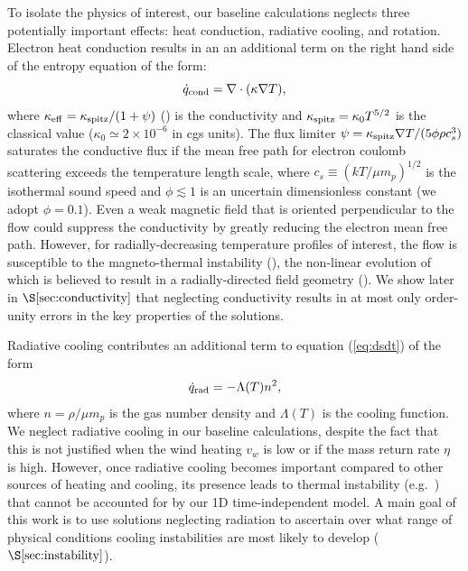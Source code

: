 \documentclass[usenatbib,fleqn]{mn2e}
\newcommand{\vwO}{v_{w}}
\begin{document}
To isolate the physics of interest, our baseline calculations neglects three potentially important effects: heat conduction, radiative cooling, and rotation.  Electron heat conduction results in an an additional term on the right hand side of the entropy equation of the form:  
\begin{equation}
\dot{q}_{\rm cond} = \nabla\cdot(\kappa \nabla T),
\label{eq:qdotcond}
 \end{equation}
where $\kappa_{\rm
  eff}=\kappa_{\rm spitz}/(1+\psi)$ (\citealt{DaltonBalbus:1993a}) is
the conductivity and $\kappa_{\rm spitz} = \kappa_0 T^{5/2}$ is the
classical \citet{Spitzer62} value ($\kappa_0\simeq 2\times 10^{-6}$ in
cgs units).  The flux limiter $\psi = \kappa_{\rm spitz} \nabla
T/(5\phi \rho c_s^3)$ saturates the conductive flux if the mean free
path for electron coulomb scattering exceeds the
temperature length scale, where $c_s \equiv (kT/\mu m_p)^{1/2}$ is the
isothermal sound speed and $\phi \lesssim 1$ is an uncertain
dimensionless constant (we adopt $\phi = 0.1$).  Even a weak magnetic
field that is oriented perpendicular to the flow could suppress the
conductivity by greatly reducing the electron mean free path.  However, for radially-decreasing temperature profiles
of interest, the flow is susceptible to the magneto-thermal instability (\citealt{Balbus01}), the non-linear evolution of which is believed to result in a radially-directed field geometry (\citealt{Parrish&Stone07}).  We show later in $\S\ref{sec:conductivity}$ that neglecting conductivity results in at most only order-unity errors in the key properties of the solutions.

Radiative cooling contributes an additional term to equation (\ref{eq:dsdt}) of the form
\begin{equation}
\dot{q}_{\rm rad} = -\Lambda(T)n^{2},
\label{eq:qdot_rad}
\end{equation}
where $n = \rho/\mu m_p$ is the gas number density and $\Lambda(T)$ is the cooling function.  We neglect radiative cooling in our baseline calculations, despite the fact that this is not justified when the wind heating $\vwO$ is low or if the mass return rate $\eta$ is high.  However, once radiative cooling becomes important compared to other sources of heating and cooling, its presence leads to thermal instability (e.g.~\citealt{McCourt+12}) that cannot be accounted for by our 1D
time-independent model.  A main goal of this work is to use solutions neglecting radiation to ascertain over what range of physical conditions cooling instabilities are most likely to develop ($\S\ref{sec:instability}$).
\end{document}
